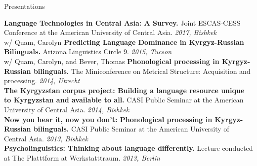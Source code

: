 \documentclass{resume} %
\begin{document}
\vspace{.25cm}

\begin{rSection}{Presentations}

  
  {\bf Language Technologies in Central Asia: A Survey.} {Joint ESCAS-CESS Conference at the American University of Central Asia.} \hfill {\em 2017, Bishkek} \\
  
{w/ Quam, Carolyn} {\bf Predicting Language Dominance in Kyrgyz-Russian Bilinguals.} {Arizona Linguistics Circle 9.} \hfill {\em 2015, Tucson} \\

{w/ Quam, Carolyn, and Bever, Thomas} {\bf Phonological processing in Kyrgyz-Russian bilinguals.} {The Miniconference on Metrical Structure: Acquisition and processing.} \hfill {\em 2014, Utrecht} \\

{\bf The Kyrgyzstan corpus project: Building a language resource unique to Kyrgyzstan and available to all.} {CASI Public Seminar at the American University of Central Asia.} \hfill {\em 2014, Bishkek} \\

{\bf Now you hear it, now you don’t: Phonological processing in Kyrgyz-Russian bilinguals.} {CASI Public Seminar at the American University of Central Asia.} \hfill {\em 2013, Bishkek} \\

{\bf Psycholinguistics: Thinking about language differently.} {Lecture conducted at The Platttform at Werkstatttraum.} \hfill {\em 2013, Berlin} \\


\end{rSection}




\end{document}
